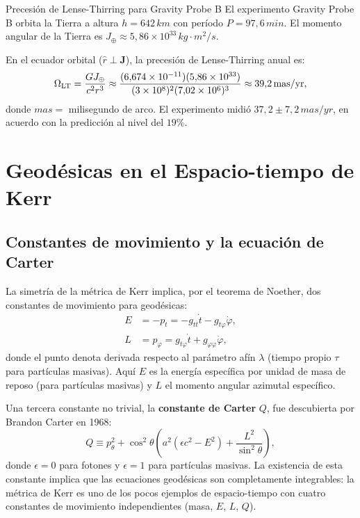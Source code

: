 \begin{ejemplo}{Precesión de Lense-Thirring para Gravity Probe B}{}
El experimento Gravity Probe B orbita la Tierra a altura $h = 642\,\si{km}$ con período $P = 97{,}6\,\si{min}$. El momento angular de la Tierra es $J_\oplus \approx 5{,}86\times10^{33}\,\si{kg\cdot m^2/s}$.

En el ecuador orbital ($\hat{r}\perp\mathbf{J}$), la precesión de Lense-Thirring anual es:
\begin{equation}
  \Omega_{\rm LT} = \frac{GJ_\oplus}{c^2 r^3}
  \approx \frac{(6{,}674\times10^{-11})(5{,}86\times10^{33})}{(3\times10^8)^2(7{,}02\times10^6)^3}
  \approx 39{,}2\,\si{mas/yr},
\end{equation}
donde $\si{mas} = $ milisegundo de arco. El experimento midió $37{,}2 \pm 7{,}2\,\si{mas/yr}$, en acuerdo con la predicción al nivel del $19\%$.
\end{ejemplo}

\section{Geodésicas en el Espacio-tiempo de Kerr}
\label{sec:geodesicas_kerr}

\subsection{Constantes de movimiento y la ecuación de Carter}

La simetría de la métrica de Kerr implica, por el teorema de Noether, dos constantes de movimiento para geodésicas:
\begin{align}
  E  &= -p_t  = -g_{tt}\dot{t} - g_{t\varphi}\dot{\varphi}, \label{eq:energia_kerr}\\
  L  &= p_\varphi = g_{t\varphi}\dot{t} + g_{\varphi\varphi}\dot{\varphi}, \label{eq:momento_ang_kerr}
\end{align}
donde el punto denota derivada respecto al parámetro afín $\lambda$ (tiempo propio $\tau$ para partículas masivas). Aquí $E$ es la energía específica por unidad de masa de reposo (para partículas masivas) y $L$ el momento angular azimutal específico.

Una tercera constante no trivial, la \textbf{constante de Carter} $Q$, fue descubierta por Brandon Carter en 1968:
\begin{equation}
  Q \equiv p_\theta^2 + \cos^2\!\theta\!\left(a^2\!\left(\epsilon c^2 - E^2\right) + \frac{L^2}{\sin^2\!\theta}\right),
  \label{eq:carter}
\end{equation}
donde $\epsilon = 0$ para fotones y $\epsilon = 1$ para partículas masivas. La existencia de esta constante implica que las ecuaciones geodésicas son completamente integrables: la métrica de Kerr es uno de los pocos ejemplos de espacio-tiempo con cuatro constantes de movimiento independientes (masa, $E$, $L$, $Q$).

